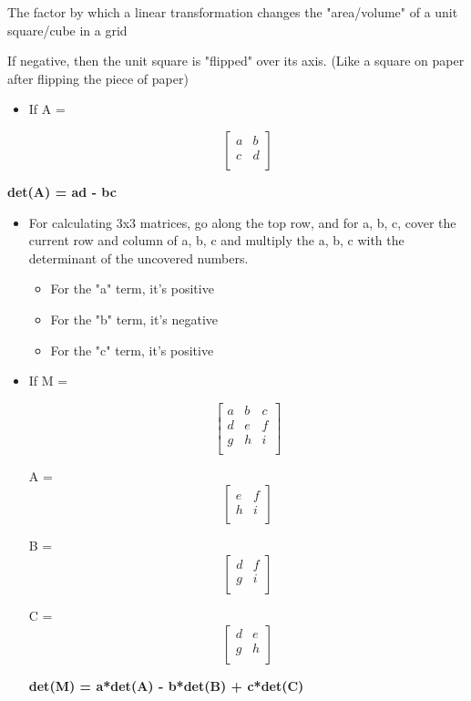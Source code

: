 \documentclass[11pt]{article}
\begin{document}
The factor by which a linear transformation changes the "area/volume" of a unit square/cube in a grid

If negative, then the unit square is "flipped" over its axis. (Like a square on paper after flipping the piece of paper)

\begin{itemize}
\item If A =

\[\begin{bmatrix}
     a&b\\
     c&d\\
     \end{bmatrix}\]
\end{itemize}


\textbf{\textbf{det(A) = ad - bc}}

\begin{itemize}
\item For calculating 3x3 matrices, go along the top row, and for a, b, c, cover the current row and column of a, b, c and multiply the a, b, c with the determinant of the uncovered numbers.
\begin{itemize}
\item For the "a" term, it's positive
\item For the "b" term, it's negative
\item For the "c" term, it's positive
\end{itemize}

\item If M =

\[\begin{bmatrix}
      a&b&c\\
      d&e&f\\
      g&h&i\\
      \end{bmatrix}\]

A = 
\[\begin{bmatrix}
      e&f\\
      h&i\\
      \end{bmatrix}\]

B = 
\[\begin{bmatrix}
      d&f\\
      g&i\\
      \end{bmatrix}\]

C = 
\[\begin{bmatrix}
      d&e\\
      g&h\\
      \end{bmatrix}\]

\textbf{\textbf{det(M) = a*det(A) - b*det(B) + c*det(C)}}
\end{itemize}
\end{document}
